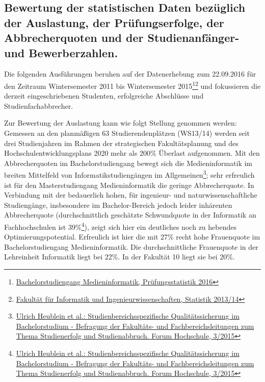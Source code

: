 \subsection{Bewertung der statistischen Daten bezüglich der
Auslastung, der Prüfungserfolge, der Abbrecherquoten und der
Studienanfänger- und
Bewerberzahlen.\label{/mi-2017/selbstbericht/0100-ist-zustand/0100-ist-zustand}}\label{bewertung-der-statistischen-daten-bezuxfcglich-der-auslastung-der-pruxfcfungserfolge-der-abbrecherquoten-und-der-studienanfuxe4nger--und-bewerberzahlen.pathlabelmi-2017selbstbericht0100-ist-zustand0100-ist-zustand}

Die folgenden Ausführungen beruhen auf der Datenerhebung zum 22.09.2016
für den Zeitraum Wintersemester 2011 bis Wintersemester 2015\footnote{\href{https://th-koeln.github.io/mi-2017/anhaenge/ba-pruefungsstatistiken.pdf}{Bachelorstudiengang
  Medieninformatik, Prüfungsstatistik 2016}}\footnote{\href{https://th-koeln.github.io/mi-2017/anhaenge/fak-Fakultaetsstruktur-Studienangebot-Personal-Haushaltsmittel-Kennzahlen-2014.pdf}{Fakultät
  für Informatik und Ingenieurwissenschaften, Statistik 2013/14}} und
fokussieren die derzeit eingeschriebenen Studenten, erfolgreiche
Abschlüsse und Studienfachabbrecher.

Zur Bewertung der Auslastung kann wie folgt Stellung genommen werden:
Gemessen an den planmäßigen 63 Studierendenplätzen (WS13/14) werden seit
drei Studienjahren im Rahmen der strategischen Fakultätsplanung und des
Hochschulentwicklungsplans 2020 mehr als 200\% Überlast aufgenommen. Mit
den Abbrecherquoten im Bachelorstudiengang bewegt sich die
Medieninformatik im breiten Mittelfeld von Informatikstudiengängen im
Allgemeinen\footnote{\href{http://www.dzhw.eu/pdf/pub_fh/fh-201503.pdf}{Ulrich
  Heublein et al.: Studienbereichsspezifische Qualitätssicherung im
  Bachelorstudium - Befragung der Fakultäts- und Fachbereichsleitungen
  zum Thema Studienerfolg und Studienabbruch. Forum Hochschule, 3/2015}};
sehr erfreulich ist für den Masterstudiengang Medieninformatik die
geringe Abbrecherquote. In Verbindung mit der bedauerlich hohen, für
ingenieur- und naturwissenschaftliche Studiengänge, insbesondere im
Bachelor-Bereich jedoch leider inhärenten Abbrecherquote
(durchschnittlich geschätzte Schwundquote in der Informatik an
Fachhochschulen ist 39\%\footnote{\href{http://www.dzhw.eu/pdf/pub_fh/fh-201503.pdf}{Ulrich
  Heublein et al.: Studienbereichsspezifische Qualitätssicherung im
  Bachelorstudium - Befragung der Fakultäts- und Fachbereichsleitungen
  zum Thema Studienerfolg und Studienabbruch. Forum Hochschule, 3/2015}}),
zeigt sich hier ein deutliches noch zu hebendes Optimierungspotential.
Erfreulich ist hier die mit 27\% recht hohe Frauenquote im
Bachelorstudiengang Medieninformatik. Die durchschnittliche Frauenquote
in der Lehreinheit Informatik liegt bei 22\%. In der Fakultät 10 liegt
sie bei 20\%.

